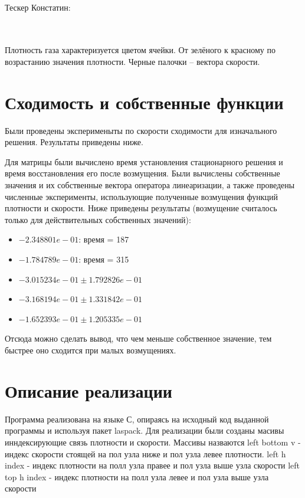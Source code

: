 \documentclass[a4paper, 25pt]{article}
\begin{document}
\\
Тескер Констатин:
\begin{figure}[h!]
\end{figure}
\\
\\
Плотность газа характеризуется цветом ячейки. От зелёного к красному по возрастанию значения плотности. Черные палочки -- вектора скорости.

\newpage
\section{Сходимость и собственные функции}
Были проведены эксперименыты по скорости сходимости для изначального решения. Результаты приведены ниже.

Для матрицы были вычислено время установления стационарного решения и время восстановления его после возмущения. Были вычислены собственные значения
и их собственные вектора оператора линеаризации, а также проведены численные эксперименты, использующие полученные возмущения функций плотности и 
скорости. Ниже приведены результаты (возмущение считалось только для действительных собственных значений):
\begin{itemize}
 \item $-2.348801e-01$: время = 187
 \item $-1.784789e-01$: время = 315
 \item $-3.015234e-01 \pm 1.792826e-01$
 \item $-3.168194e-01 \pm 1.331842e-01$
 \item $-1.652393e-01 \pm 1.205335e-01$
\end{itemize}
Отсюда можно сделать вывод, что чем меньше собственное значение, тем быстрее оно сходится при малых возмущениях.
\section{Описание реализации}
Программа реализована на языке С, опираясь на исходный код выданной программы и используя пакет laspack.
Для реализации были созданы масивы инндексирующие связь плотности и скорости. Массивы назваются left bottom v - индекс скорости стоящей на пол узла ниже и пол узла левее плотности.
left h index -  индекс плотности на полл узла правее и пол узла выше узла скорости
left top h index -  индекс плотности на полл узла левее и пол узла выше узла скорости
\end{document}
